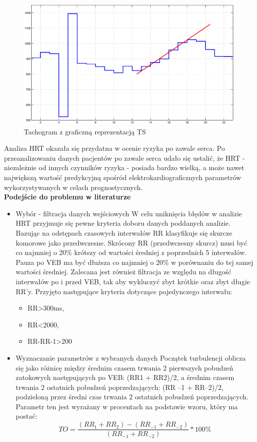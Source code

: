 \begin{figure}[h]
\centerline{\includegraphics[scale=0.32]{HRT/HRT3.eps}}
\caption{Tachogram z graficzną reprezentacją TS}
\end{figure}

Analiza HRT okazała się przydatna w ocenie ryzyka po zawale serca. Po przeanalizowaniu danych pacjentów po zawale serca udało się ustalić, że HRT - niezależnie od innych czynników ryzyka - posiada bardzo wielką, a może nawet największą wartość predykcyjną spośród elektrokardiograficznych parametrów wykorzystywanych w celach prognostycznych. \\


\textbf{Podejście do problemu w literaturze}

\begin{itemize}
\item Wybór - filtracja danych wejściowych 
W celu uniknięcia błędów w analizie HRT przyjmuje się pewne kryteria doboru danych poddanych analizie. Bazując na odstępach czasowych interwałów RR klasyfikuje się skurcze komorowe jako przedwczesne. Skrócony RR (przedwczesny skurcz) musi być co najmniej o 20\% krótszy od wartości średniej z poprzednich 5 interwałów. Pauza po VEB ma być dłuższa co najmniej o 20\% w porównaniu do tej samej wartości średniej. Zalecana jest również filtracja ze względu na długość interwałów po i przed VEB, tak aby wykluczyć zbyt krótkie oraz zbyt długie RR’y. Przyjęto następujące kryteria dotyczące pojedynczego interwału: 
\begin{itemize}
\item RR>300ms,
\item  RR<2000,
\item RR-RR-1>200
\end{itemize}

\item Wyznaczanie parametrów z wybranych danych
Początek turbulencji oblicza się jako różnicę między średnim czasem trwania 2 pierwszych pobudzeń zatokowych następujących po VEB: (RR1 + RR2)/2, a średnim czasem trwania 2 ostatnich pobudzeń poprzedzających: (RR –1 + RR–2)/2, podzieloną przez średni czas trwania 2 ostatnich pobudzeń poprzedzających. Parametr ten jest wyrażany w procentach na podstawie wzoru, który ma postać:
\begin{equation}
TO=\frac{(RR_1+RR_2) - (RR_{-1} + RR_{-2})}{(RR_{-1} + RR_{-2})} * 100\%
\end{equation}
\end{itemize}


